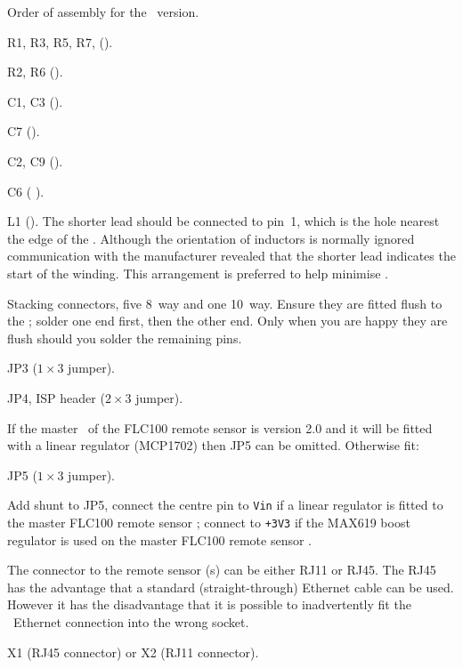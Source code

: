   Order of assembly
for the \PoE\ version.
\begin{buildorder}
\item R1, R3, R5, R7, ().
\item R2, R6 ().
\item C1, C3 ().
\item C7 ().
\item C2, C9 ().
\item C6 ( ).
\item L1 (). The shorter lead should be connected to pin~1,
  which is the hole nearest the edge of the \pcb. Although the
  orientation of inductors is normally ignored communication with the
  manufacturer revealed that the shorter lead indicates the start of
  the winding. This arrangement is preferred to help minimise \rfi.
\item Stacking connectors, five 8~way and one 10~way. Ensure they are
  fitted flush to the \pcb; solder one end first, then the other
  end. Only when you are happy they are flush should you solder the
  remaining pins.
\item JP3 ($1 \times 3$ jumper).
\item JP4, ISP header ($2 \times 3$ jumper).
\end{buildorder}

If the master \pcb\ of the FLC100 remote sensor is version 2.0 and it
will be fitted with a linear regulator (MCP1702) then JP5 can be
omitted. Otherwise fit:
\begin{buildorder*}
\item JP5 ($1 \times 3$ jumper).
\item Add shunt to JP5, connect the centre pin to \texttt{Vin} if a
  linear regulator is fitted to the master FLC100 remote sensor \pcb;
  connect to \texttt{+3V3} if the MAX619 boost regulator is used on
  the master FLC100 remote sensor \pcb.
\end{buildorder*}


The connector to the remote sensor \pcb{}(s) can be either RJ11 or
RJ45. The RJ45 has the advantage that a standard (straight-through)
Ethernet cable can be used. However it has the disadvantage that it is
possible to inadvertently fit the \PoE\ Ethernet connection into the
wrong socket.
\begin{buildorder*}
\item X1 (RJ45 connector) or X2 (RJ11 connector). 
\end{buildorder*}

